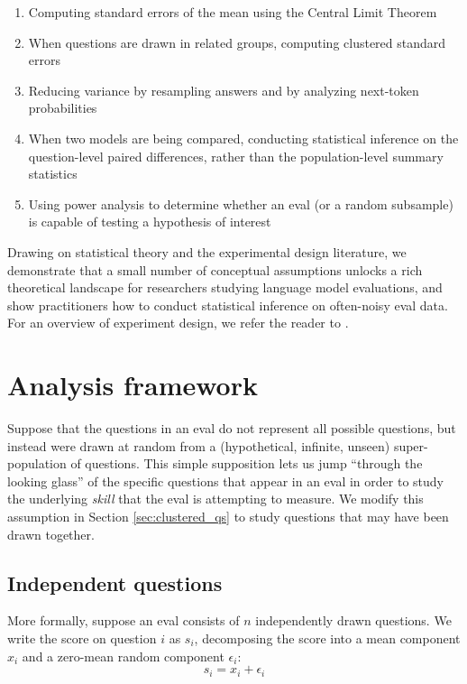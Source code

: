 \documentclass[11pt, oneside]{article}   	%
\begin{document}
\begin{enumerate}
\item Computing standard errors of the mean using the Central Limit Theorem
\item When questions are drawn in related groups, computing clustered standard errors
\item Reducing variance by resampling answers and by analyzing next-token probabilities
\item When two models are being compared, conducting statistical inference on the question-level paired differences, rather than the population-level summary statistics
\item Using power analysis to determine whether an eval (or a random subsample) is capable of testing a hypothesis of interest
\end{enumerate}

Drawing on statistical theory and the experimental design literature, we demonstrate that a small number of conceptual assumptions unlocks a rich theoretical landscape for researchers studying language model evaluations, and show practitioners how to conduct statistical inference on often-noisy eval data. For an overview of experiment design, we refer the reader to \cite{Imbens_Rubin_2015}.

\section{Analysis framework}

Suppose that the questions in an eval do not represent all possible questions, but instead were drawn at random from a (hypothetical, infinite, unseen) super-population of questions. This simple supposition lets us jump ``through the looking glass'' of the specific questions that appear in an eval in order to study the underlying {\em skill} that the eval is attempting to measure. We modify this assumption in Section \ref{sec:clustered_qs} to study questions that may have been drawn together.

\subsection{Independent questions}

More formally, suppose an eval consists of $n$ independently drawn questions. We write the score on question $i$ as $s_i$, decomposing the score into a mean component $x_i$ and a zero-mean random component $\epsilon_i$:
\[
s_i = x_i + \epsilon_i
\]
\end{document}
